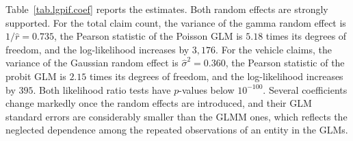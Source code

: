 Table~\ref{tab.lgpif.coef} reports the estimates. Both random effects
are strongly supported. For the total claim count, the variance of the
gamma random effect is \(1/\widehat r=0.735\), the Pearson statistic of
the Poisson GLM is \(5.18\) times its degrees of freedom, and the
log-likelihood increases by \(3{,}176\). For the vehicle claims, the
variance of the Gaussian random effect is \(\widehat\sigma^2=0.360\),
the Pearson statistic of the probit GLM is \(2.15\) times its degrees of
freedom, and the log-likelihood increases by \(395\). Both likelihood
ratio tests have \(p\)-values below \(10^{-100}\). Several coefficients
change markedly once the random effects are introduced, and their GLM
standard errors are considerably smaller than the GLMM ones, which
reflects the neglected dependence among the repeated observations of an
entity in the GLMs.

